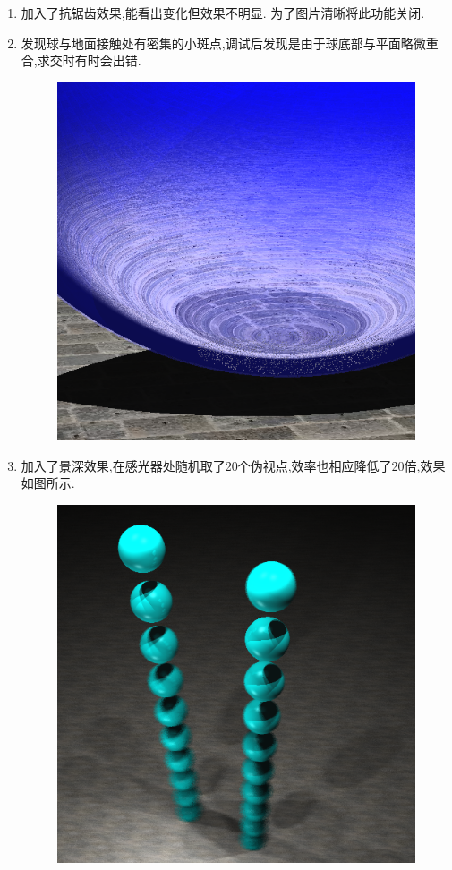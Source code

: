 \begin{enumerate}
  \item 加入了抗锯齿效果,能看出变化但效果不明显. 为了图片清晰将此功能关闭.

  \item 发现球与地面接触处有密集的小斑点,调试后发现是由于球底部与平面略微重合,求交时有时会出错.
    \begin{figure}[H]
      \centering
      \includegraphics[scale=0.4]{img/smallpoint.png}
    \end{figure}

  \item 加入了景深效果,在感光器处随机取了20个伪视点,效率也相应降低了20倍,效果如图所示.
    \begin{figure}[H]
      \centering
      \includegraphics[scale=0.4]{img/dof.png}
      \caption*{\label{fig:dof}}
    \end{figure}


\end{enumerate}
